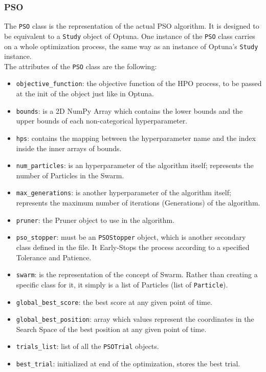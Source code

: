 \subsubsection{PSO}

The \texttt{PSO} class is the representation of the actual PSO algorithm. It is designed to be equivalent to a \texttt{Study} object of Optuna.
One instance of the \texttt{PSO} class carries on a whole optimization process, the same way as an instance of Optuna's \texttt{Study} instance.
% 
\\[0.3cm]The attributes of the \texttt{PSO} class are the following:
\begin{itemize}[itemsep=0.1cm]
    \item \texttt{objective\_function}: the objective function of the HPO process, to be passed at the init of the object just like in Optuna.
    \item \texttt{bounds}: is a 2D NumPy Array which contains the lower bounds and the upper bounds of each non-categorical hyperparameter.
    \item \texttt{hps}: contains the mapping between the hyperparameter name and the index inside the inner arrays of bounds.
    \item \texttt{num\_particles}: is an hyperparameter of the algorithm itself; represents the number of Particles in the Swarm.
    \item \texttt{max\_generations}: is another hyperparameter of the algorithm itself; represents the maximum number of iterations (Generations) of the algorithm.
    \item \texttt{pruner}: the Pruner object to use in the algorithm.
    \item \texttt{pso\_stopper}: must be an \texttt{PSOStopper} object, which is another secondary class defined in the file. It Early-Stops the process according to a specified Tolerance and Patience.
    \item \texttt{swarm}: is the representation of the concept of Swarm. Rather than creating a specific class for it, it simply is a list of Particles (list of \texttt{Particle}).
    \item \texttt{global\_best\_score}: the best score at any given point of time.
    \item \texttt{global\_best\_position}: array which values represent the coordinates in the Search Space of the best position at any given point of time.
    \item \texttt{trials\_list}: list of all the \texttt{PSOTrial} objects.
    \item \texttt{best\_trial}: initialized at end of the optimization, stores the best trial.
\end{itemize}
